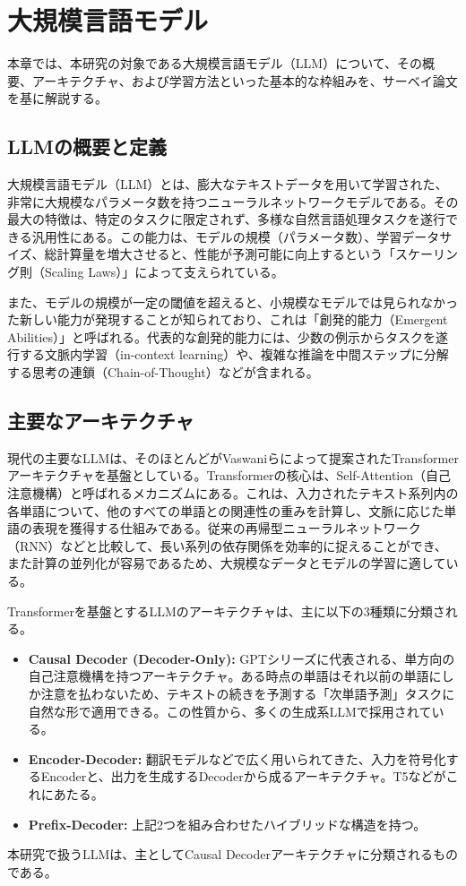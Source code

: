 \documentclass[a4paper,11pt]{jreport}
\begin{document}
\chapter{大規模言語モデル}
\label{chap:llm}
本章では、本研究の対象である大規模言語モデル（LLM）について、その概要、アーキテクチャ、および学習方法といった基本的な枠組みを、サーベイ論文\cite{LLMSurvey}を基に解説する。

\section{LLMの概要と定義}
大規模言語モデル（LLM）とは、膨大なテキストデータを用いて学習された、非常に大規模なパラメータ数を持つニューラルネットワークモデルである。その最大の特徴は、特定のタスクに限定されず、多様な自然言語処理タスクを遂行できる汎用性にある\cite{LLMSurvey}。この能力は、モデルの規模（パラメータ数）、学習データサイズ、総計算量を増大させると、性能が予測可能に向上するという「スケーリング則（Scaling Laws）」によって支えられている\cite{LLMSurvey}。

また、モデルの規模が一定の閾値を超えると、小規模なモデルでは見られなかった新しい能力が発現することが知られており、これは「創発的能力（Emergent Abilities）」と呼ばれる\cite{LLMSurvey}。代表的な創発的能力には、少数の例示からタスクを遂行する文脈内学習（in-context learning）や、複雑な推論を中間ステップに分解する思考の連鎖（Chain-of-Thought）などが含まれる。

\section{主要なアーキテクチャ}
現代の主要なLLMは、そのほとんどがVaswaniらによって提案されたTransformerアーキテクチャ\cite{Transformers}を基盤としている。Transformerの核心は、Self-Attention（自己注意機構）と呼ばれるメカニズムにある。これは、入力されたテキスト系列内の各単語について、他のすべての単語との関連性の重みを計算し、文脈に応じた単語の表現を獲得する仕組みである。従来の再帰型ニューラルネットワーク（RNN）などと比較して、長い系列の依存関係を効率的に捉えることができ、また計算の並列化が容易であるため、大規模なデータとモデルの学習に適している\cite{LLMSurvey}。

Transformerを基盤とするLLMのアーキテクチャは、主に以下の3種類に分類される\cite{LLMSurvey}。
\begin{itemize}
    \item \textbf{Causal Decoder (Decoder-Only):} GPTシリーズ\cite{GPT-3}に代表される、単方向の自己注意機構を持つアーキテクチャ。ある時点の単語はそれ以前の単語にしか注意を払わないため、テキストの続きを予測する「次単語予測」タスクに自然な形で適用できる。この性質から、多くの生成系LLMで採用されている。
    \item \textbf{Encoder-Decoder:} 翻訳モデルなどで広く用いられてきた、入力を符号化するEncoderと、出力を生成するDecoderから成るアーキテクチャ。T5\cite{T5}などがこれにあたる。
    \item \textbf{Prefix-Decoder:} 上記2つを組み合わせたハイブリッドな構造を持つ。
\end{itemize}
本研究で扱うLLMは、主としてCausal Decoderアーキテクチャに分類されるものである。
\end{document}
